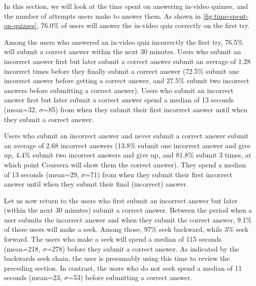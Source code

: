 \documentclass{sigchi}
\begin{document}
In this section, we will look at the time spent on answering in-video quizzes, and the number of attempts users make to answer them. As shown in \autoref{fig:time-spent-on-quizzes}, 76.0\% of users will answer the in-video quiz correctly on the first try.


Among the users who answered an in-video quiz incorrectly the first try, 76.5\% will submit a correct answer within the next 30 minutes. Users who submit an incorrect answer first but later submit a correct answer submit an average of 1.28 incorrect times before they finally submit a correct answer (72.5\% submit one incorrect answer before getting a correct answer, and 27.5\% submit two incorrect answers before submitting a correct answer). Users who submit an incorrect answer first but later submit a correct answer spend a median of 13 seconds (mean=32, $\sigma$=85) from when they submit their first incorrect answer until when they submit a correct answer.

Users who submit an incorrect answer and never submit a correct answer submit an average of 2.68 incorrect answers (13.8\% submit one incorrect answer and give up, 4.4\% submit two incorrect answers and give up, and 81.8\% submit 3 times, at which point Coursera will show them the correct answer). They spend a median of 13 seconds (mean=29, $\sigma$=71) from when they submit their first incorrect answer until when they submit their final (incorrect) answer.

Let us now return to the users who first submit an incorrect answer but later (within the next 30 minutes) submit a correct answer. Between the period when a user submits the incorrect answer and when they submit the correct answer, 9.1\% of these users will make a seek. Among those, 97\% seek backward, while 3\% seek forward. The users who make a seek will spend a median of 115 seconds (mean=218, $\sigma$=278) before they submit a correct answer. As indicated by the backwards seek chain, the user is presumably using this time to review the preceding section. In contrast, the users who do not seek spend a median of 11 seconds (mean=23, $\sigma$=53) before submitting a correct answer.
\end{document}
